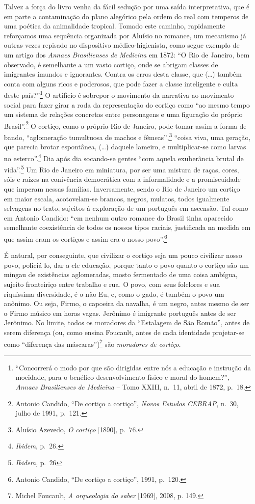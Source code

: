 Talvez a força do livro venha da fácil sedução por uma saída
interpretativa, que é em parte a contaminação do plano alegórico pela
ordem do real com temperos de uma poética da animalidade tropical.
Tomado este caminho, rapidamente reforçamos uma sequência organizada por
Aluísio no romance, um mecanismo já outras vezes repisado no dispositivo
médico-higienista, como segue exemplo de um artigo dos \emph{Annaes
Brasilienses de Medicina} em 1872: ``O Rio de Janeiro, bem observado, é
semelhante a um vasto cortiço, onde se abrigam classes de imigrantes
imundos e ignorantes. Contra os erros desta classe, que (\ldots{})
também conta com alguns ricos e poderosos, que pode fazer a classe
inteligente e culta deste país?''\footnote{``Concorrerá o modo por que
  são dirigidas entre nós a educação e instrução da mocidade, para o
  benéfico desenvolvimento físico e moral do homem?'', \emph{Annaes
  Brasilienses de Medicina} -- Tomo XXIII, n.~11, abril de 1872, p.~18.}
O artifício é sobrepor o movimento da narrativa ao movimento social para
fazer girar a roda da representação do cortiço como ``ao mesmo tempo um
sistema de relações concretas entre personagens e uma figuração do
próprio Brasil''.\footnote{Antonio Candido, ``De cortiço a cortiço'',
  \emph{Novos Estudos CEBRAP}, n.~30, julho de 1991, p.~121.} O cortiço,
como o próprio Rio de Janeiro, pode tomar assim a forma de bando,
``aglomeração tumultuosa de machos e fêmeas'',\footnote{Aluísio Azevedo,
  \emph{O cortiço} {[}1890{]}\emph{,} p.~76.} ``coisa viva, uma geração,
que parecia brotar espontânea, (\ldots{}) daquele lameiro, e
multiplicar-se como larvas no esterco''.\footnote{\emph{Ibidem}, p.~26.}
Dia após dia socando-se gentes ``com aquela exuberância brutal de
vida''.\footnote{\emph{Ibidem,} p.~26} Um Rio de Janeiro em miniatura,
por ser uma mistura de raças, cores, sóis e raízes na conivência
democrática com a informalidade e a promiscuidade que imperam nessas
famílias. Inversamente, sendo o Rio de Janeiro um cortiço em maior
escala, acotovelam-se brancos, negros, mulatos, todos igualmente
selvagens no trato, sujeitos à exploração de um português em ascensão.
Tal como em Antonio Candido: ``em nenhum outro romance do Brasil tinha
aparecido semelhante coexistência de todos os nossos tipos raciais,
justificada na medida em que assim eram os cortiços e assim era o nosso
povo''.\footnote{Antonio Candido, ``De cortiço a cortiço'', 1991,
  p.~120.}

É natural, por conseguinte, que civilizar o cortiço seja um pouco
civilizar nosso povo, policiá-lo, dar a ele educação, porque tanto o
povo quanto o cortiço são um mingau de existências aglomeradas, mosto
fermentado de uma coisa ambígua, sujeito fronteiriço entre trabalho e
rua. O povo, com seus folclores e sua riquíssima diversidade, é o não
Eu, e, como o gado, é também o povo um anônimo. Ou seja, Firmo, o
capoeira da navalha, é um negro, antes mesmo de ser o Firmo músico em
horas vagas. Jerônimo é imigrante português antes de ser Jerônimo. No
limite, todos os moradores da ``Estalagem de São Romão'', antes de serem
diferença (ou, como ensina Foucault, antes de cada identidade
projetar-se como ``diferença das máscaras'')\footnote{Michel Foucault,
  \emph{A arqueologia do saber} {[}1969{]}, 2008, p. 149.} são
\emph{moradores de cortiço}.


